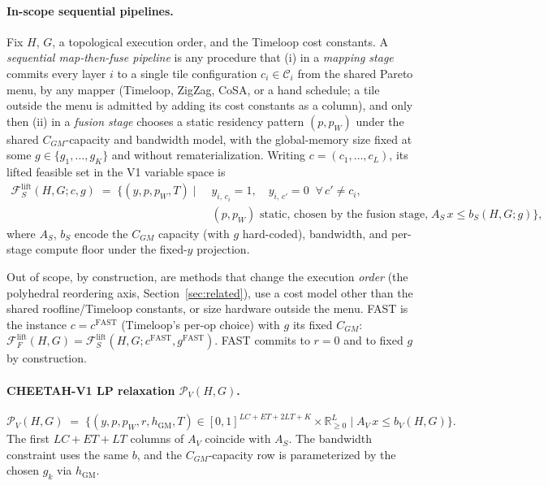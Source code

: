 \paragraph{In-scope sequential pipelines.}
\begin{definition}
\label{def:seq_scope}
Fix $H$, $G$, a topological execution order, and the Timeloop cost constants.
A \emph{sequential map-then-fuse pipeline} is any procedure that
(i) in a \emph{mapping stage} commits every layer $i$ to a single tile
configuration $c_i \in \mathcal{C}_i$ from the shared Pareto menu, by any
mapper (Timeloop, ZigZag, CoSA, or a hand schedule; a tile outside the menu is
admitted by adding its cost constants as a column), and only then
(ii) in a \emph{fusion stage} chooses a static residency pattern $(p, p_W)$
under the shared $C_{GM}$-capacity and bandwidth model, with the global-memory
size fixed at some $g \in \{g_1,\ldots,g_K\}$ and without rematerialization.
Writing $c = (c_1,\ldots,c_L)$, its lifted feasible set in the V1 variable
space is
\begin{equation}
\begin{split}
\mathcal{F}_S^{\mathrm{lift}}(H,G;c,g) \;=\; \Big\{(y, p, p_W, T) \;\Big|\;
&\; y_{i,\, c_i} = 1,\quad
y_{i,\, c'} = 0 \;\;\forall\, c' \ne c_i, \\
&\; \text{$(p,p_W)$ static, chosen by the fusion stage,}\quad
A_S\, x \le b_S(H,G;g) \Big\},
\end{split}
\end{equation}
where $A_S$, $b_S$ encode the $C_{GM}$ capacity (with $g$ hard-coded),
bandwidth, and per-stage compute floor under the fixed-$y$ projection.
\end{definition}
Out of scope, by construction, are methods that change the execution
\emph{order} (the polyhedral reordering axis, Section~\ref{sec:related}), use a
cost model other than the shared roofline/Timeloop constants, or size hardware
outside the menu. FAST is the instance $c = c^{\mathrm{FAST}}$ (Timeloop's
per-op choice) with $g$ its fixed $C_{GM}$:
$\mathcal{F}_F^{\mathrm{lift}}(H,G) = \mathcal{F}_S^{\mathrm{lift}}(H,G;c^{\mathrm{FAST}},g^{\mathrm{FAST}})$.
FAST commits to $r{=}0$ and to fixed $g$ by construction.

\paragraph{CHEETAH-V1 LP relaxation $\mathcal{P}_V(H,G)$.}
$$
\mathcal{P}_V(H,G) \;=\; \{(y, p, p_W, r, h_{\mathrm{GM}}, T) \in [0,1]^{LC+ET+2LT+K} \times \mathbb{R}_{\ge 0}^{L} \mid A_V\, x \le b_V(H,G)\}.
$$
The first $LC + ET + LT$ columns of $A_V$ coincide with $A_S$. The bandwidth
constraint uses the same $b$, and the $C_{GM}$-capacity row is parameterized by
the chosen $g_k$ via $h_{\mathrm{GM}}$.

